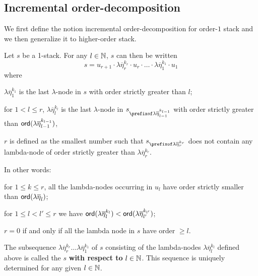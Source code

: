 \documentclass[a4paper]{article}
\theoremstyle{remark}
\theoremstyle{definition}
\begin{document}

\subsection{Incremental order-decomposition}

We first define the notion incremental order-decomposition for order-$1$ stack and we then generalize it to higher-order stack.

Let $s$ be a 1-stack. For any $l\in \mathbb{N}$, $s$ can then be written
$$ s = u_{r+1} \cdot \lambda \overline{\eta}_r^{k_r} \cdot u_r \cdot
\ldots \cdot \lambda \overline{\eta}_1^{k_1} \cdot  u_1 $$
where
\begin{compactitem}
\item  $\lambda \overline{\eta}_1^{k_1}$ is the
last $\lambda$-node in $s$ with order strictly greater than $l$;

\item for $1 < l \leq r$, $\lambda
\overline{\eta}_l^{k_l}$ is the last $\lambda$-node in $s_{\prefixof
\lambda \overline{\eta}_{l-1}^{k_{l-1}}}$ with order strictly
greater than ${\sf ord}(\lambda \overline{\eta}_{l-1}^{k_{l-1}})$,

\item  $r$ is defined as the smallest number such that
$s_{\prefixof \lambda \overline{\eta}_{r}^{k_{r}}}$ does not contain
any lambda-node of order strictly greater than $\lambda
\overline{\eta}_{r}^{k_{r}}$.
\end{compactitem}

\noindent In other words:
\begin{compactitem}
\item for $1 \leq k \leq r$, all the lambda-nodes occurring in $u_l$ have order
strictly smaller than ${\sf ord}(\lambda \overline{\eta}_l)$;
\item for $1\leq l<l'\leq r$ we have ${\sf ord}(\lambda \overline{\eta}_l^{k_l})
< {\sf ord}(\lambda \overline{\eta}_{l'}^{k_{l'}})$;
\item $r=0$ if and only if all the lambda node in $s$ have order $\geq l$.
\end{compactitem}

The subsequence $\lambda \overline{\eta}_r^{k_r} \ldots \lambda\overline{\eta}_1^{k_1}$ of $s$ consisting of the lambda-nodes $\lambda
\overline{\eta}_l^{k_l}$ defined above is called the  $s$ {\bf with respect to} $l\in\mathbb{N}$.
This sequence is uniquely determined for any given $l\in \mathbb{N}$.
\end{document}
